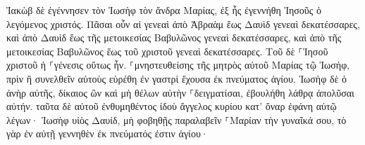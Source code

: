\documentclass{openreader}
\begin{document}
Ἰακὼβ δὲ ἐγέννησεν τὸν Ἰωσὴφ τὸν ἄνδρα Μαρίας, ἐξ ἧς ἐγεννήθη Ἰησοῦς ὁ λεγόμενος χριστός. 
Πᾶσαι οὖν αἱ γενεαὶ ἀπὸ Ἀβραὰμ ἕως Δαυὶδ γενεαὶ δεκατέσσαρες, καὶ ἀπὸ Δαυὶδ ἕως τῆς μετοικεσίας Βαβυλῶνος γενεαὶ δεκατέσσαρες, καὶ ἀπὸ τῆς μετοικεσίας Βαβυλῶνος ἕως τοῦ χριστοῦ γενεαὶ δεκατέσσαρες. 
Τοῦ δὲ ⸀Ἰησοῦ χριστοῦ ἡ ⸀γένεσις οὕτως ἦν. ⸀μνηστευθείσης τῆς μητρὸς αὐτοῦ Μαρίας τῷ Ἰωσήφ, πρὶν ἢ συνελθεῖν αὐτοὺς εὑρέθη ἐν γαστρὶ ἔχουσα ἐκ πνεύματος ἁγίου. 
Ἰωσὴφ δὲ ὁ ἀνὴρ αὐτῆς, δίκαιος ὢν καὶ μὴ θέλων αὐτὴν ⸀δειγματίσαι, ἐβουλήθη λάθρᾳ ἀπολῦσαι αὐτήν. 
ταῦτα δὲ αὐτοῦ ἐνθυμηθέντος ἰδοὺ ἄγγελος κυρίου κατ’ ὄναρ ἐφάνη αὐτῷ λέγων· Ἰωσὴφ υἱὸς Δαυίδ, μὴ φοβηθῇς παραλαβεῖν ⸀Μαρίαν τὴν γυναῖκά σου, τὸ γὰρ ἐν αὐτῇ γεννηθὲν ἐκ πνεύματός ἐστιν ἁγίου· 
\end{document}
